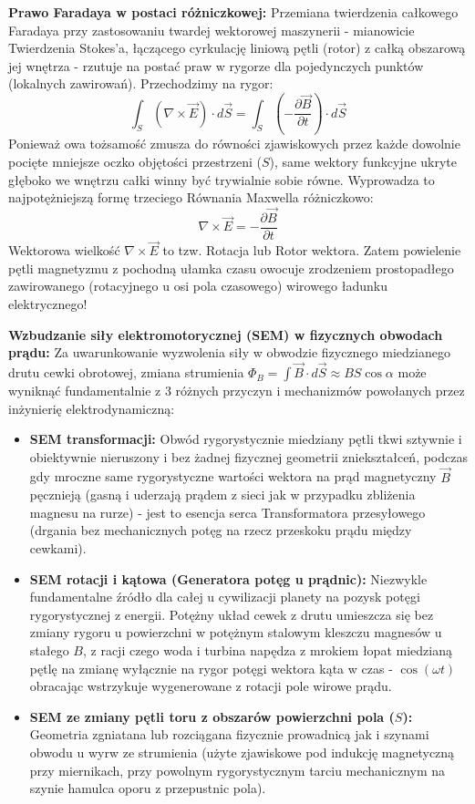 \documentclass[11pt, a4paper]{article}
\begin{document}
\textbf{Prawo Faradaya w postaci różniczkowej:}
Przemiana twierdzenia całkowego Faradaya przy zastosowaniu twardej wektorowej maszynerii - mianowicie Twierdzenia Stokes'a, łączącego cyrkulację liniową pętli (rotor) z całką obszarową jej wnętrza - rzutuje na postać praw w rygorze dla pojedynczych punktów (lokalnych zawirowań).
Przechodzimy na rygor:
\[
\int_S (\nabla \times \vec{E}) \cdot d\vec{S} = \int_S \left( -\frac{\partial \vec{B}}{\partial t} \right) \cdot d\vec{S}
\]
Ponieważ owa tożsamość zmusza do równości zjawiskowych przez każde dowolnie pocięte mniejsze oczko objętości przestrzeni ($S$), same wektory funkcyjne ukryte głęboko we wnętrzu całki winny być trywialnie sobie równe. Wyprowadza to najpotężniejszą formę trzeciego Równania Maxwella różniczkowo:
\[
\nabla \times \vec{E} = -\frac{\partial \vec{B}}{\partial t}
\]
Wektorowa wielkość $\nabla \times \vec{E}$ to tzw. Rotacja lub Rotor wektora. Zatem powielenie pętli magnetyzmu z pochodną ułamka czasu owocuje zrodzeniem prostopadłego zawirowanego (rotacyjnego u osi pola czasowego) wirowego ładunku elektrycznego!

\textbf{Wzbudzanie siły elektromotorycznej (SEM) w fizycznych obwodach prądu:}
Za uwarunkowanie wyzwolenia siły w obwodzie fizycznego miedzianego drutu cewki obrotowej, zmiana strumienia $\Phi_B = \int \vec{B} \cdot d\vec{S} \approx B S \cos\alpha$ może wyniknąć fundamentalnie z 3 różnych przyczyn i mechanizmów powołanych przez inżynierię elektrodynamiczną:
\begin{itemize}
    \item \textbf{SEM transformacji:} Obwód rygorystycznie miedziany pętli tkwi sztywnie i obiektywnie nieruszony i bez żadnej fizycznej geometrii zniekształceń, podczas gdy mroczne same rygorystyczne wartości wektora na prąd magnetyczny $\vec{B}$ pęcznieją (gasną i uderzają prądem z sieci jak w przypadku zbliżenia magnesu na rurze) - jest to esencja serca Transformatora przesyłowego (drgania bez mechanicznych potęg na rzecz przeskoku prądu między cewkami).
    \item \textbf{SEM rotacji i kątowa (Generatora potęg u prądnic):} Niezwykle fundamentalne źródło dla całej u cywilizacji planety na pozysk potęgi rygorystycznej z energii. Potężny układ cewek z drutu umieszcza się bez zmiany rygoru u powierzchni w potężnym stalowym kleszczu magnesów u stałego $B$, z racji czego woda i turbina napędza z mrokiem łopat miedzianą pętlę na zmianę wyłącznie na rygor potęgi wektora kąta w czas - $\cos(\omega t)$ obracając wstrzykuje wygenerowane z rotacji pole wirowe prądu.
    \item \textbf{SEM ze zmiany pętli toru z obszarów powierzchni pola ($S$):} Geometria zgniatana lub rozciągana fizycznie prowadnicą jak i szynami obwodu u wyrw ze strumienia (użyte zjawiskowe pod indukcję magnetyczną przy miernikach, przy powolnym rygorystycznym tarciu mechanicznym na szynie hamulca oporu z przepustnic pola).
\end{itemize}
\end{document}
